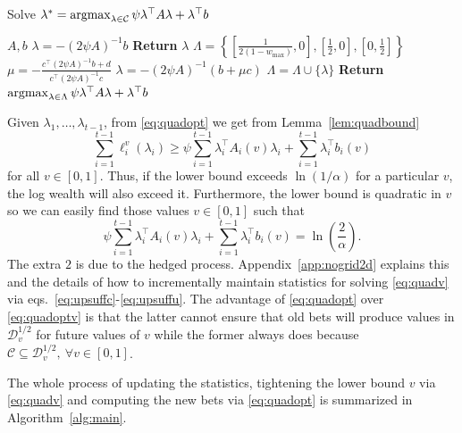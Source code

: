 \begin{algorithm}[tb]
   \caption{Solve $\lambda^* = \operatorname*{argmax}_{\lambda \in \mathcal{C}} \psi \lambda^\top A \lambda + \lambda^\top b$}
   \label{alg:argmax}
\begin{algorithmic}
     $A, b$
    \STATE $\lambda = -(2\psi A)^{-1} b$
        \STATE \textbf{Return} $\lambda$
    \ENDIF
    \STATE $\Lambda = \left\{\left[\frac{1}{2(1-w_{\max})},0\right],\left[\frac12,0\right],\left[0,\frac12\right]\right\}$     
    \STATE $\mu = -\frac{c^\top (2\psi A)^{-1}b+d}{c^\top (2\psi A)^{-1}c}$
    \STATE $\lambda = -(2\psi A)^{-1} (b + \mu c)$ 
    \STATE $\Lambda = \Lambda \cup \{\lambda\}$ 
    \ENDIF 
    \ENDFOR
    \STATE \textbf{Return}  $\operatorname*{argmax}_{\lambda \in \Lambda} \psi \lambda^\top A \lambda + \lambda^\top b$
\end{algorithmic}
\end{algorithm}

Given $\lambda_1,\ldots,\lambda_{t-1}$, from \eqref{eq:quadopt} 
we get from Lemma~\ref{lem:quadbound} 
\[
\sum_{i=1}^{t-1} \ell_i^v(\lambda_i)
\geq
\psi  
 \sum_{i=1}^{t-1} \lambda_i^\top A_i(v)\lambda_i  +  \sum_{i=1}^{t-1} \lambda_i^\top b_i(v)
\]
for all $v \in [0,1]$. Thus, if the lower bound exceeds $\ln(1/\alpha)$ 
for a particular $v$, the log wealth will also exceed it. Furthermore,
the lower bound is quadratic in $v$ so we can easily find those values
$v \in [0,1]$ such that
\begin{equation}
   \psi  
 \sum_{i=1}^{t-1} \lambda_i^\top A_i(v)\lambda_i  +  \sum_{i=1}^{t-1} \lambda_i^\top b_i(v) = \ln\left(\frac{2}{\alpha}\right).
 \label{eq:quadv}
\end{equation} 
The extra $2$ is due to the hedged process.  Appendix~\ref{app:nogrid2d}
explains this and the details of how to incrementally maintain statistics for solving
\eqref{eq:quadv} via eqs.~\eqref{eq:upsuffc}-\eqref{eq:upsuffu}.  The advantage
of \eqref{eq:quadopt} over \eqref{eq:quadoptv} is that the latter cannot ensure
that old bets will produce values in $\mathcal{D}_v^{1/2}$ for future values of
$v$ while the former always does because $\mathcal{C} \subseteq
\mathcal{D}_{v}^{1/2},~ \forall v \in [0,1]$. 

The whole process of updating the statistics, tightening the lower bound $v$
via \eqref{eq:quadv} and computing the new bets via \eqref{eq:quadopt} is
summarized in Algorithm~\ref{alg:main}.

